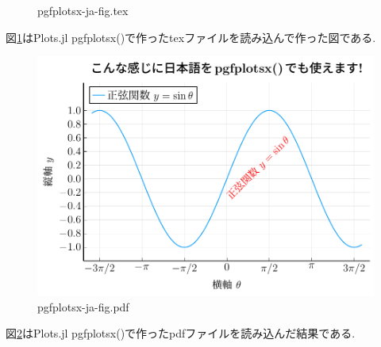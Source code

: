 \documentclass[%
  lualatex,
  ja=standard,
  textwidth-limit=60,
  a4paper, 12pt,
  oneside,
  everyparhook=compat]{bxjsarticle}
\begin{document}
\begin{figure}[htbp]
\centering
\scalebox{0.7}{}
\caption{pgfplotsx-ja-fig.tex}
\label{fig:pgfplotsx-ja-fig.tex}
\end{figure}

\noindent
図\ref{fig:pgfplotsx-ja-fig.tex}はPlots.jl pgfplotsx()で作ったtexファイルを読み込んで作った図である.

\begin{figure}[htbp]
\centering
\includegraphics[width=0.7\columnwidth]{pgfplotsx-ja-fig.pdf}
\caption{pgfplotsx-ja-fig.pdf}
\label{fig:pgfplotsx-ja-fig.pdf}
\end{figure}

\noindent
図\ref{fig:pgfplotsx-ja-fig.pdf}はPlots.jl pgfplotsx()で作ったpdfファイルを読み込んだ結果である.

\end{document}

